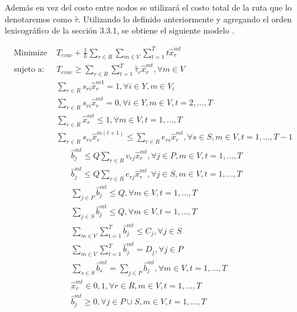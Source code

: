 \documentclass[letter, 10pt]{article}
\begin{document}
Además en vez del costo entre nodos se utilizará el costo total de la ruta que lo denotaremos como $\hat{\tau}$. Utilizando lo definido anteriormente y agregando el orden lexicográfico de la sección 3.3.1, se obtiene el siguiente modelo .

\begin{align}
\text{Minimize }& T_{evac} + \frac{1}{L}\sum_{r\in R} \sum_{m\in V} \sum_{t=1}^T t \hat{x}_r^{mt}\\
\text{sujeto a: }& T_{evac} \geq  \sum_{r \in R}  \sum_{t=1}^T \hat{\tau}_{r} \hat{x}_{r}^{mt}, \forall m \in V\\
& \sum_{r\in R} s_{ri} \hat{x}_r^{m1} = 1, \forall i \in Y, m \in V_i\\
& \sum_{r \in R} s_{ri} \hat{x}_r^{mt} = 0, \forall i \in Y, m \in V, t = 2,\dots,T\\
& \sum_{r \in R} \hat{x}_r^{mt} \leq 1, \forall m \in V, t = 1,\dots, T\\
& \sum_{r \in R} s_{rs} \hat{x}_r^{m(t+1)} \leq \sum_{r \in R} e_{rs} \hat{x}_r^{mt}, \forall s \in S, m \in V, t = 1, \dots, T-1
\end{align}
\begin{align}
&\hat{b}_j^{mt} \leq Q \sum_{r\in R} v_{rj} \hat{x}_r^{mt}, \forall j \in P , m \in V, t = 1,\dots,T\\
&\hat{b}_j^{mt} \leq Q \sum_{r\in R} e_{rj} \hat{x}_r^{mt}, \forall j \in S , m \in V, t = 1,\dots,T\\
&\sum_{j \in P} \hat{b}_j^{mt} \leq Q, \forall m \in V, t = 1,\dots,T\\
&\sum_{j \in S} \hat{b}_j^{mt} \leq Q, \forall m \in V, t = 1,\dots,T\\
&\sum_{m \in V} \sum_{t = 1}^T \hat{b}_j^{mt} \leq C_j, \forall j \in S\\
&\sum_{m \in V} \sum_{t = 1}^T \hat{b}_j^{mt} = D_j, \forall j \in P\\
&\sum_{s \in S} \hat{b}_s^{mt} = \sum_{j \in P} \hat{b}_j^{mt}, \forall m \in V, t = 1,\dots,T\\
& \hat{x}_r^{mt} \in {0,1}, \forall r \in R, m \in V, t = 1,\dots,T\\
&\hat{b}_j^{mt} \geq 0, \forall j \in P \cup S, m \in V, t = 1,\dots,T
\end{align}
\end{document}

